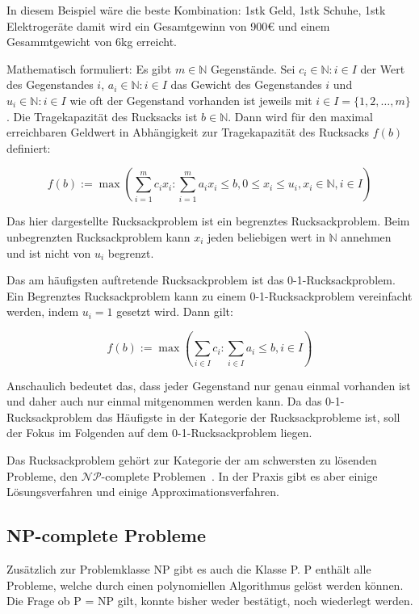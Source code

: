 \documentclass[12pt, a4paper, ngerman]{article}
\newcommand{\natnums}{\ensuremath{\mathbb{N}}}
\begin{document}
In diesem Beispiel wäre die beste Kombination: 1stk Geld, 1stk Schuhe, 1stk Elektrogeräte
damit wird ein Gesamtgewinn von 900€ und einem Gesammtgewicht von 6kg erreicht.

Mathematisch formuliert: Es gibt \(m\in\natnums\) Gegenstände.
Sei \(c_i\in\natnums : i\in I\) der Wert des Gegenstandes \(i\),
\(a_i\in\natnums : i\in I\) das Gewicht des Gegenstandes \(i\)
und \(u_i\in \natnums : i\in I\) wie oft der Gegenstand vorhanden ist jeweils mit \(i\in I = \{1 ,2 ,\ldots ,m\} \).
Die Tragekapazität des Rucksacks ist \(b\in\natnums\).
Dann wird für den maximal erreichbaren Geldwert in Abhängigkeit zur Tragekapazität des Rucksacks \(f(b)\) definiert:

\[
  f(b):=\max(\sum_{i=1}^m c_i x_i : \sum_{i=1}^m a_i x_i\leq b, 0\leq x_i\leq u_i,  x_i\in\natnums, i\in I)
\]

Das hier dargestellte Rucksackproblem ist ein begrenztes Rucksackproblem.
Beim unbegrenzten Rucksackproblem kann \(x_i\) jeden beliebigen wert in \(\natnums \) annehmen und ist nicht von \(u_i\) begrenzt.

Das am häufigsten auftretende Rucksackproblem ist das 0-1-Rucksackproblem.
Ein Begrenztes Rucksackproblem kann zu einem 0-1-Rucksackproblem vereinfacht werden, indem \(u_i=1\) gesetzt wird. Dann gilt:

\[
  f(b):=\max(\sum_{i\in I}c_i : \sum_{i\in I}a_i\leq b, i\in I)
\]

Anschaulich bedeutet das, dass jeder Gegenstand nur genau einmal vorhanden ist
und daher auch nur einmal mitgenommen werden kann. Da das 0-1-Rucksackproblem das Häufigste in der Kategorie der Rucksackprobleme ist, soll der Fokus im Folgenden auf dem 0-1-Rucksackproblem liegen. %

Das Rucksackproblem gehört zur Kategorie der am schwersten zu lösenden Probleme,
den \(\mathcal{NP}\)-complete Problemen~\cite{mainKnapsack}.
In der Praxis gibt es aber einige Lösungsverfahren und einige Approximationsverfahren.

\subsection{NP-complete Probleme}
Zusätzlich zur Problemklasse NP gibt es auch die Klasse P. P enthält alle Probleme, welche durch einen polynomiellen Algorithmus gelöst werden können. Die Frage ob P = NP gilt, konnte bisher weder bestätigt, noch wiederlegt werden.
\cite[Kap. 15]{KombinatorischeOptimierung}
\end{document}
